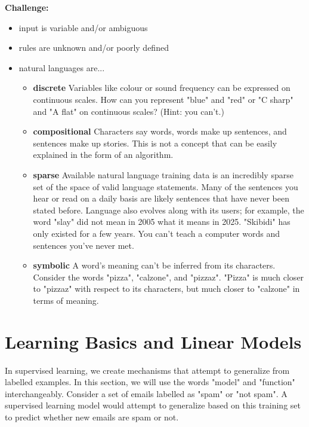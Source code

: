 \documentclass{article}
\begin{document}
  \noindent \textbf{Challenge:} \begin{itemize}
    \item input is variable and/or ambiguous
    \item rules are unknown and/or poorly defined
    \item natural languages are... 
    \begin{itemize}
      \item \textbf{discrete } Variables like colour or sound frequency can be expressed on continuous scales. How can you represent "blue" and "red" or "C sharp" and "A flat" on continuous scales? (Hint: you can't.)
      \item \textbf{compositional } Characters say words, words make up sentences, and sentences make up stories. This is not a concept that can be easily explained in the form of an algorithm.
      \item \textbf{sparse } Available natural language training data is an incredibly sparse set of the space of valid language statements. %
      Many of the sentences you hear or read on a daily basis are likely sentences that have never been stated before. Language also evolves along with its users; for example, the word "slay" did not mean in 2005 what it means in 2025. "Skibidi" has only existed for a few years. You can't teach a computer words and sentences you've never met.
      \item \textbf{symbolic } A word's meaning can't be inferred from its characters. Consider the words "pizza", "calzone", and "pizzaz". "Pizza" is much closer to "pizzaz" with respect to its characters, but much closer to "calzone" in terms of meaning.
    \end{itemize}
  \end{itemize}


\section{Learning Basics and Linear Models}

In supervised learning, we create mechanisms that attempt to generalize from labelled examples. In this section, we will use the words "model" and "function" interchangeably. %
Consider a set of emails labelled as "spam" or "not spam". A supervised learning model would attempt to generalize based on this training set to predict whether new emails are spam or not. 
\end{document}
